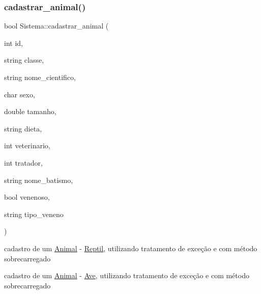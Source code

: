 \subsubsection{\texorpdfstring{cadastrar\_animal()}{cadastrar\_animal()}\hspace{0.1cm}{\footnotesize\ttfamily [10/12]}}
{\footnotesize\ttfamily bool Sistema\+::cadastrar\+\_\+animal (\begin{DoxyParamCaption}\item[{int}]{id,  }\item[{string}]{classe,  }\item[{string}]{nome\+\_\+cientifico,  }\item[{char}]{sexo,  }\item[{double}]{tamanho,  }\item[{string}]{dieta,  }\item[{int}]{veterinario,  }\item[{int}]{tratador,  }\item[{string}]{nome\+\_\+batismo,  }\item[{bool}]{venenoso,  }\item[{string}]{tipo\+\_\+veneno }\end{DoxyParamCaption})}



cadastro de um \mbox{\hyperlink{class_animal}{Animal}} -\/ \mbox{\hyperlink{class_reptil}{Reptil}}, utilizando tratamento de exceção e com método sobrecarregado 

cadastro de um \mbox{\hyperlink{class_animal}{Animal}} -\/ \mbox{\hyperlink{class_ave}{Ave}}, utilizando tratamento de exceção e com método sobrecarregado \mbox{\label{class_sistema_ac02c0c9e6e1a5546801822c3fb467c36}} 
